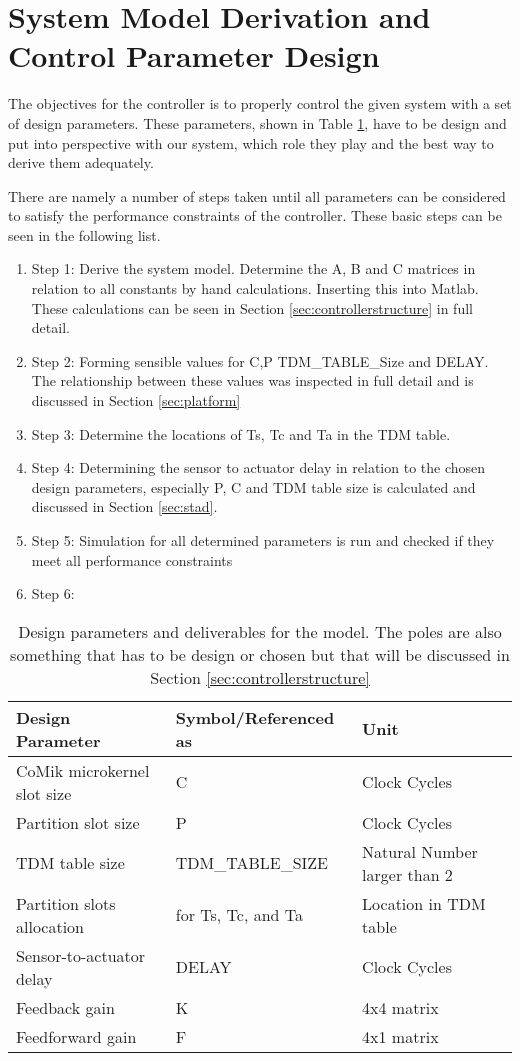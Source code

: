 \section{System Model Derivation and Control Parameter Design}
The objectives for the controller is to properly control the given system with a set of design parameters. These parameters, shown in Table \ref{tab:design}, have to be design and put into perspective with our system, which role they play and the best way to derive them adequately.

There are namely a number of steps taken until all parameters can be considered to satisfy the performance constraints of the controller. These basic steps can be seen in the following list.

\begin{enumerate}
	\item Step 1: Derive the system model. Determine the A, B and C matrices in relation to all constants by hand calculations. Inserting this into Matlab. These calculations can be seen in Section \ref{sec:controllerstructure} in full detail.
	\item Step 2: Forming sensible values for C,P TDM\_TABLE\_Size and DELAY. The relationship between these values was inspected in full detail and is discussed in Section \ref{sec:platform}
	\item Step 3: Determine the locations of Ts, Tc and Ta in the TDM table.
	\item Step 4: Determining the sensor to actuator delay in relation to the chosen design parameters, especially P, C and TDM table size is calculated and discussed in Section \ref{sec:stad}. 
	\item Step 5: Simulation for all determined parameters is run and checked if they meet all performance constraints 
	\item Step 6:
\end{enumerate}


\begin{table}[h!]
	\centering
	\caption{Design parameters and deliverables for the model. The poles are also something that has to be design or chosen but that will be discussed in Section \ref{sec:controllerstructure}}
	\begin{tabular}{lll}
		\toprule
		Design Parameter & Symbol/Referenced as &Unit\\
		\midrule
		CoMik microkernel slot size& C & Clock Cycles \\
		Partition slot size& P & Clock Cycles\\
		TDM table size& TDM\_TABLE\_SIZE & Natural Number larger than 2\\
		Partition slots allocation	& for Ts, Tc, and Ta & Location in TDM table \\
		Sensor-to-actuator	delay& DELAY & Clock Cycles	\\
		Feedback gain& K & 4x4 matrix \\
		Feedforward gain& F & 4x1 matrix \\
		\midrule		
	\end{tabular}
	\label{tab:design}
\end{table}

